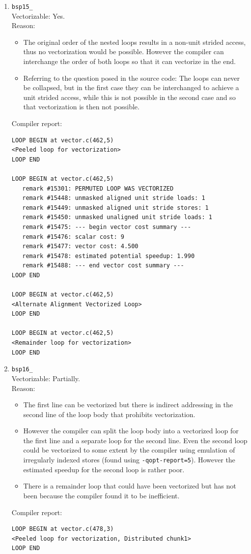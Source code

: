 \documentclass[11pt]{article}
\begin{document}
\begin{enumerate}
\item \texttt{bsp15\_}\\
Vectorizable: Yes.\\
Reason:
\begin{itemize}
\item The original order of the nested loops results in a non-unit strided access, thus no vectorization would be possible. However the compiler can interchange the order of both loops so that it can vectorize in the end.
\item Referring to the question posed in the source code: The loops can never be collapsed, but in the first case they can be interchanged to achieve a unit strided access, while this is not possible in the second case and so that vectorization is then not possible.
\end{itemize}
Compiler report:
\begin{lstlisting}
LOOP BEGIN at vector.c(462,5)
<Peeled loop for vectorization>
LOOP END

LOOP BEGIN at vector.c(462,5)
   remark #15301: PERMUTED LOOP WAS VECTORIZED
   remark #15448: unmasked aligned unit stride loads: 1 
   remark #15449: unmasked aligned unit stride stores: 1 
   remark #15450: unmasked unaligned unit stride loads: 1 
   remark #15475: --- begin vector cost summary ---
   remark #15476: scalar cost: 9 
   remark #15477: vector cost: 4.500 
   remark #15478: estimated potential speedup: 1.990 
   remark #15488: --- end vector cost summary ---
LOOP END

LOOP BEGIN at vector.c(462,5)
<Alternate Alignment Vectorized Loop>
LOOP END

LOOP BEGIN at vector.c(462,5)
<Remainder loop for vectorization>
LOOP END
\end{lstlisting}

\item \texttt{bsp16\_}\\
Vectorizable: Partially.\\
Reason:
\begin{itemize}
\item The first line can be vectorized but there is indirect addressing in the second line of the loop body that prohibits vectorization.
\item However the compiler can split the loop body into a vectorized loop for the first line and a separate loop for the second line. Even the second loop could be vectorized to some extent by the compiler using emulation of irregularly indexed stores (found using \texttt{-qopt-report=5}). However the estimated speedup for the second loop is rather poor.
\item There is a remainder loop that could have been vectorized but has not been because the compiler found it to be inefficient.
\end{itemize}
Compiler report:
\begin{lstlisting}
LOOP BEGIN at vector.c(478,3)
<Peeled loop for vectorization, Distributed chunk1>
LOOP END


\end{lstlisting}
\end{enumerate}
\end{document}
